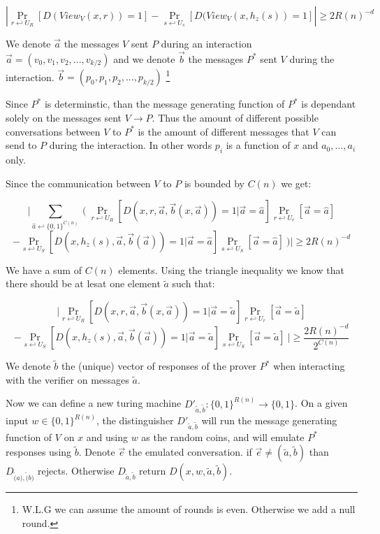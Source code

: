 \documentclass[11]{article}
\newenvironment{proof}[1][Proof]{\begin{trivlist}
\item[\hskip \labelsep {\bfseries #1}]}{\end{trivlist}}
\begin{document}
\begin{proof}
$$ |\Pr_{r \hookleftarrow U_R}[D(View_V(x, r)) = 1] - \Pr_{s \hookleftarrow U_s}[D(View_V(x, h_z(s)) = 1]| \geq 2R(n)^{-d}$$

We denote $\vec{a}$ the messages $V$ sent $P$ during an interaction $\vec{a} = (v_0, v_1, v_2,..., v_{k/2})$ and we denote $\vec{b}$ the messages $P^*$ sent $V$ during the interaction. $\vec{b} = (p_0, p_1, p_2,..., p_{k/2})$ \footnote{W.L.G we can assume the amount of rounds is even. Otherwise we add a null round.}

Since $P^*$ is determinstic, than the message generating function of $P^*$ is dependant solely on the messages sent $V \to P$. Thus the amount of different possible conversations between $V$ to $P^*$ is the amount of different messages that $V$ can send to $P$ during the interaction. In other words $p_i$ is a function of $x$ and $a_0,...,a_i$ only.

Since the communication between $V$ to $P$ is bounded by $C(n)$ we get:

$$ \bigg| \sum_{\hat{a} \hookleftarrow \{0,1\}^{C(n)}}\
\bigg(\
\Pr_{r \hookleftarrow U_R} [D(x, r,\vec{a}, \vec{b}(x,\vec{a})) = 1 | \vec{a}=\hat{a}]\Pr_{r \hookleftarrow U_r}[\vec{a}=\hat{a}]$$
$$- \Pr_{s \hookleftarrow U_S} [D(x, h_z(s),\vec{a}, \vec{b}(\vec{a})) = 1 | \vec{a}=\hat{a}]\Pr_{s \hookleftarrow U_S}[\vec{a}=\hat{a}]\
\bigg) \bigg| \geq 2R(n)^{-d}$$

We have a sum of $C(n)$ elements. Using the triangle inequality we know that there should be at lesat one element $\tilde{a}$ such that:

$$ \bigg| \Pr_{r \hookleftarrow U_R} [D(x, r,\vec{a}, \vec{b}(x,\vec{a})) = 1 | \vec{a}=\tilde{a}]\Pr_{r \hookleftarrow U_r}[\vec{a}=\tilde{a}]$$
$$- \Pr_{s \hookleftarrow U_S} [D(x, h_z(s),\vec{a}, \vec{b}(\vec{a})) = 1 | \vec{a}=\tilde{a}]\Pr_{s \hookleftarrow U_S}[\vec{a}=\tilde{a}]\
\bigg| \geq \frac{2R(n)^{-d}}{2^{C(n)}}$$

We denote $\tilde{b}$ the (unique) vector of responses of the prover $P^*$ when interacting with the verifier on messages $\tilde{a}$.

Now we can define a new turing machine $D'_{\tilde{a}, \tilde{b}}: \{0,1\}^{R(n)} \to \{0,1\}$. On a given input $w \in \{0,1\}^{R(n)}$, the distinguisher $D'_{\tilde{a}, \tilde{b}}$ will run the message generating function of $V$ on $x$ and using $w$ as the random coins, and will emulate $P^*$ responses using $\tilde{b}$. Denote $\vec{e}$ the emulated conversation. if $\vec{e} \neq (\tilde{a}, \tilde{b})$ than $D_{\tilde(a), \tilde(b)}$ rejects. Otherwise $D_{\tilde{a}, \tilde{b}}$ return $D(x, w, \tilde{a}, \tilde{b})$.


\end{proof}
\end{document}
